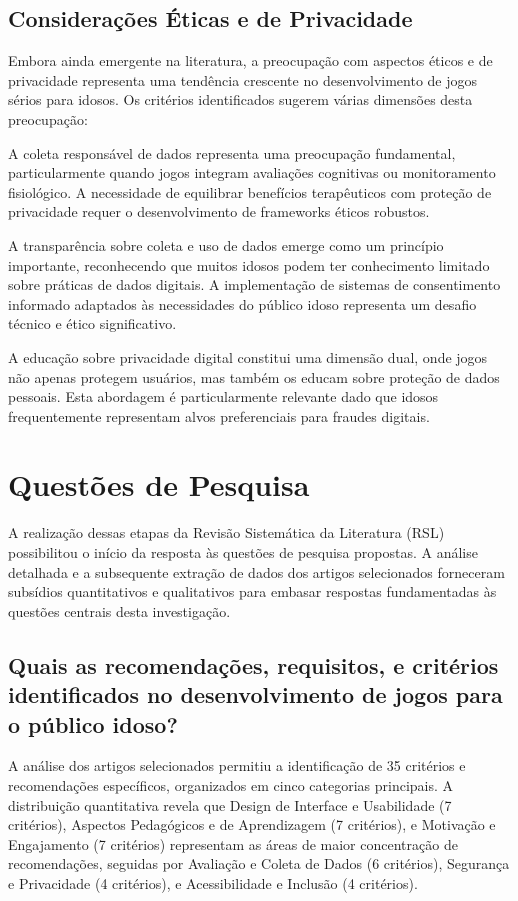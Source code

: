 \begin{table}[H]
\subsection{Considerações Éticas e de Privacidade}
\label{subsec:etica_privacidade}

Embora ainda emergente na literatura, a preocupação com aspectos éticos e de privacidade representa uma tendência crescente no desenvolvimento de jogos sérios para idosos. Os critérios identificados sugerem várias dimensões desta preocupação:

A coleta responsável de dados representa uma preocupação fundamental, particularmente quando jogos integram avaliações cognitivas ou monitoramento fisiológico. A necessidade de equilibrar benefícios terapêuticos com proteção de privacidade requer o desenvolvimento de frameworks éticos robustos.

A transparência sobre coleta e uso de dados emerge como um princípio importante, reconhecendo que muitos idosos podem ter conhecimento limitado sobre práticas de dados digitais. A implementação de sistemas de consentimento informado adaptados às necessidades do público idoso representa um desafio técnico e ético significativo.

A educação sobre privacidade digital constitui uma dimensão dual, onde jogos não apenas protegem usuários, mas também os educam sobre proteção de dados pessoais. Esta abordagem é particularmente relevante dado que idosos frequentemente representam alvos preferenciais para fraudes digitais.

\section{Questões de Pesquisa}
\label{sec:qp}

A realização dessas etapas da Revisão Sistemática da Literatura (RSL) possibilitou o início da resposta às questões de pesquisa propostas. A análise detalhada e a subsequente extração de dados dos artigos selecionados forneceram subsídios quantitativos e qualitativos para embasar respostas fundamentadas às questões centrais desta investigação.

\subsection{Quais as recomendações, requisitos, e critérios identificados no desenvolvimento de jogos para o público idoso?}
\label{subsec:qp1}

A análise dos artigos selecionados permitiu a identificação de 35 critérios e recomendações específicos, organizados em cinco categorias principais. A distribuição quantitativa revela que Design de Interface e Usabilidade (7 critérios), Aspectos Pedagógicos e de Aprendizagem (7 critérios), e Motivação e Engajamento (7 critérios) representam as áreas de maior concentração de recomendações, seguidas por Avaliação e Coleta de Dados (6 critérios), Segurança e Privacidade (4 critérios), e Acessibilidade e Inclusão (4 critérios).


\end{table}
